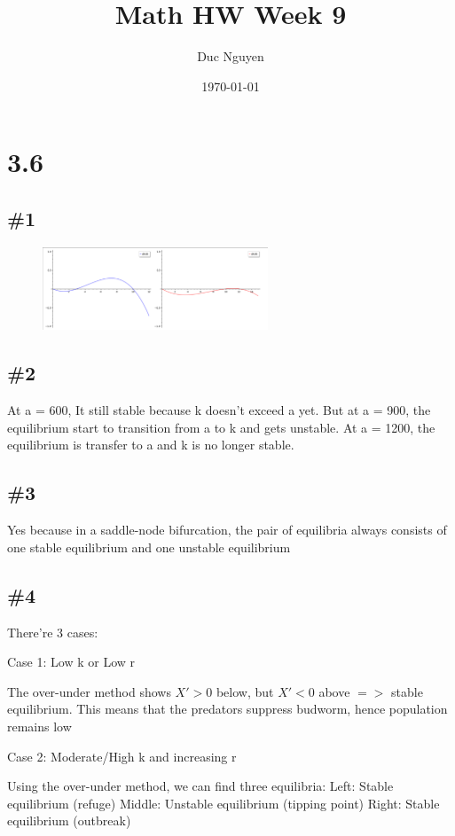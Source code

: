 \documentclass[12pt]{article}
\title{Math HW Week 9}
\author{Duc Nguyen}
\date{\today}
\begin{document}
\maketitle
\section*{3.6}
\subsection*{\#1}
\begin{figure}[htbp] %
  \centering
  \includegraphics[width=0.6\textwidth]{hw9.png}
\end{figure}

\subsection*{\#2}
At a = 600, It still stable because k doesn't exceed a yet. But at a = 900, the equilibrium start to transition from a to k and gets unstable. At a = 1200, the equilibrium is transfer to a and k is no longer stable.

\subsection*{\#3}
Yes because in a saddle-node bifurcation, the pair of equilibria always consists of one stable equilibrium and one unstable equilibrium

\subsection*{\#4}
There're 3 cases: 

Case 1: Low k or Low r

The over-under method shows $X' > 0$ below, but $X' < 0$ above $=>$ stable equilibrium. This means that the predators suppress budworm, hence population remains low

Case 2: Moderate/High k and increasing r

Using the over-under method, we can find three equilibria:
Left: Stable equilibrium (refuge)
Middle: Unstable equilibrium (tipping point)
Right: Stable equilibrium (outbreak)
\end{document}
